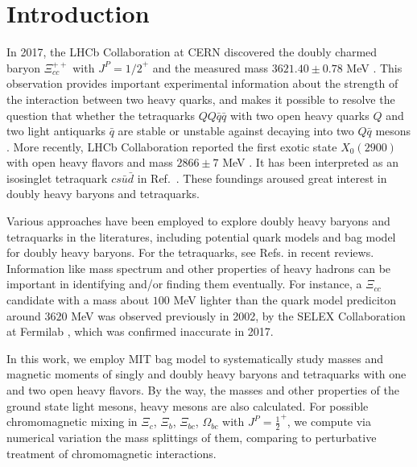 \documentclass[prd,twocolumn,floatfix,nofootinbib]{revtex4}
\begin{document}
\maketitle\section{Introduction}
In 2017, the LHCb Collaboration at CERN discovered the doubly charmed baryon $\Xi_{cc}^{++}$ with $J^{P}={1/2}^{+}$ and the measured mass $3621.40\pm 0.78$ MeV \cite{Aaij:2017ueg}. 
This observation provides important experimental information about the strength of the interaction between two heavy quarks, and makes it possible to resolve the question 
that whether the tetraquarks $QQ\bar{q}\bar{q}$ with two open heavy quarks $Q$ and two light antiquarks $\bar{q}$ are stable or unstable against decaying into two $Q\bar{q}$ mesons \cite{Karliner:2017qjm,Eichten:2017ffp,Luo:2017eub}. 
More recently, LHCb Collaboration reported the first exotic state $X_{0}(2900)$ with open heavy flavors and mass $2866\pm 7$ MeV \cite{LHCb:2020kd}. 
It has been interpreted as an isosinglet tetraquark $cs\bar{u}\bar{d}$ in Ref.~\cite{Karliner:2020vsi}. 
These foundings aroused great interest in doubly heavy baryons and tetraquarks.

Various approaches have been employed to explore doubly heavy baryons and tetraquarks in the literatures, including potential quark models and bag model \cite{Fleck:1989mb,Ebert:2004ck,Bernotas:2012nz,He:2004px,Karliner:2014gca,Liu:2018euh} for doubly heavy baryons. 
For the tetraquarks, see Refs. \cite{Ali:2017jda,Liu:2019zoy} in recent reviews. 
Information like mass spectrum and other properties of heavy hadrons can be important in identifying and/or finding them eventually. 
For instance, a $\Xi_{cc}$ candidate with a mass about $100$ MeV lighter than the quark model prediciton around $3620$ MeV \cite{Ebert:2004ck,Karliner:2014gca} was observed previously in 2002, 
by the SELEX Collaboration at Fermilab \cite{Moinester:2002uw}, which was confirmed inaccurate in 2017.

In this work, we employ MIT bag model to systematically study masses and magnetic moments of singly and doubly heavy baryons and tetraquarks with one and two open heavy flavors. 
By the way, the masses and other properties of the ground state light mesons, heavy mesons are also calculated. For possible chromomagnetic mixing in $\Xi_{c}$, $\Xi_{b}$, $\Xi_{bc}$, $\Omega_{bc}$ with $J^{P}={\frac{1}{2}}^{+}$, 
we compute via numerical variation the mass splittings of them, comparing to perturbative treatment of chromomagnetic interactions.
\end{document}
